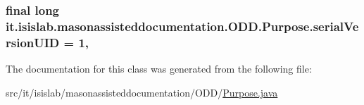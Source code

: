 \hypertarget{classit_1_1isislab_1_1masonassisteddocumentation_1_1_o_d_d_1_1_purpose_aabfd879a5b409631066010578ae8ae38}{
\subsubsection[{serial\-Version\-U\-I\-D}]{\setlength{\rightskip}{0pt plus 5cm}final long it.\-isislab.\-masonassisteddocumentation.\-O\-D\-D.\-Purpose.\-serial\-Version\-U\-I\-D = 1\hspace{0.3cm}{\ttfamily [static]}, {\ttfamily [private]}}}\label{classit_1_1isislab_1_1masonassisteddocumentation_1_1_o_d_d_1_1_purpose_aabfd879a5b409631066010578ae8ae38}


The documentation for this class was generated from the following file\-:\begin{DoxyCompactItemize}
\item 
src/it/isislab/masonassisteddocumentation/\-O\-D\-D/\hyperlink{_purpose_8java}{Purpose.\-java}\end{DoxyCompactItemize}
